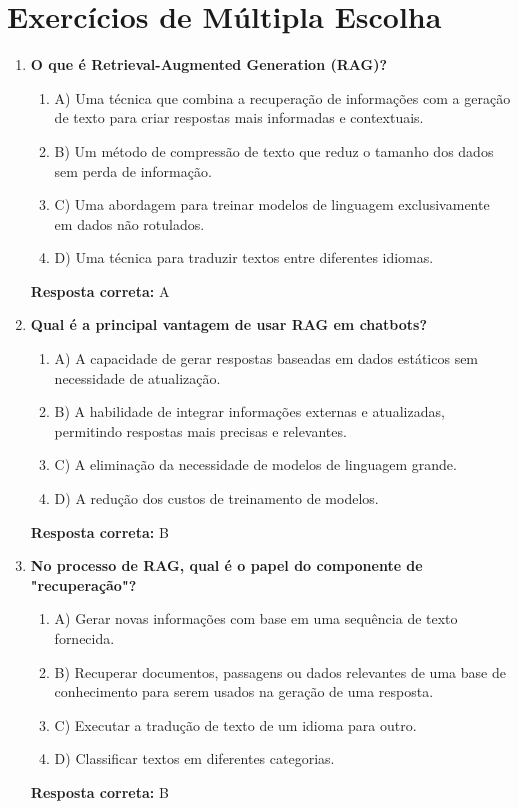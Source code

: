 \documentclass[14pt,a4paper,oneside]{book}
\begin{document}
\section*{Exercícios de Múltipla Escolha}

\begin{enumerate}
	
	\item \textbf{O que é Retrieval-Augmented Generation (RAG)?}
	\begin{enumerate}[label=\alph*)]
		\item A) Uma técnica que combina a recuperação de informações com a geração de texto para criar respostas mais informadas e contextuais.
		\item B) Um método de compressão de texto que reduz o tamanho dos dados sem perda de informação.
		\item C) Uma abordagem para treinar modelos de linguagem exclusivamente em dados não rotulados.
		\item D) Uma técnica para traduzir textos entre diferentes idiomas.
	\end{enumerate}
	\vspace{5mm}
	\textbf{Resposta correta:} A
	
	\item \textbf{Qual é a principal vantagem de usar RAG em chatbots?}
	\begin{enumerate}[label=\alph*)]
		\item A) A capacidade de gerar respostas baseadas em dados estáticos sem necessidade de atualização.
		\item B) A habilidade de integrar informações externas e atualizadas, permitindo respostas mais precisas e relevantes.
		\item C) A eliminação da necessidade de modelos de linguagem grande.
		\item D) A redução dos custos de treinamento de modelos.
	\end{enumerate}
	\vspace{5mm}
	\textbf{Resposta correta:} B
	
	\item \textbf{No processo de RAG, qual é o papel do componente de "recuperação"?}
	\begin{enumerate}[label=\alph*)]
		\item A) Gerar novas informações com base em uma sequência de texto fornecida.
		\item B) Recuperar documentos, passagens ou dados relevantes de uma base de conhecimento para serem usados na geração de uma resposta.
		\item C) Executar a tradução de texto de um idioma para outro.
		\item D) Classificar textos em diferentes categorias.
	\end{enumerate}
	\vspace{5mm}
	\textbf{Resposta correta:} B
	

\end{enumerate}
\end{document}
